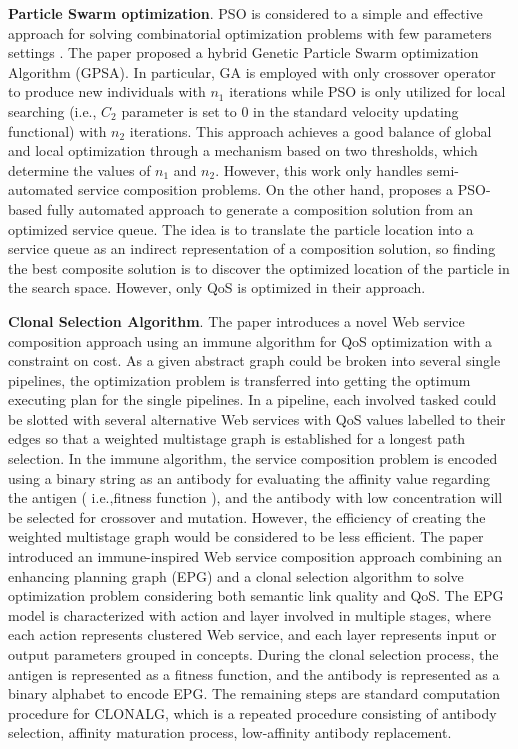 \textbf{Particle Swarm optimization}.
PSO is considered to a simple and effective approach for solving combinatorial optimization problems with few parameters settings \cite{long2009environment}. The paper \cite{liu2007hybrid} proposed a hybrid Genetic Particle Swarm optimization Algorithm (GPSA). In particular, GA is employed with only crossover operator to produce new individuals with $n_1$ iterations while PSO is only utilized for local searching (i.e., $C_2$ parameter is set to 0 in the standard velocity updating functional) with $n_2$ iterations. This approach achieves a good balance of global and local optimization through a  mechanism based on two thresholds, which determine the values of $n_1$ and $n_2$. However, this work \cite{liu2007hybrid} only handles semi-automated service composition problems. On the other hand, \cite{da2016particle} proposes a PSO-based fully automated approach to generate a composition solution from an optimized service queue. The idea is to translate the particle location into a service queue as an indirect representation of a composition solution, so finding the best composite solution is to discover the optimized location of the particle in the search space. However, only QoS is optimized in their approach.

\textbf{Clonal Selection Algorithm}.
The paper \cite{yan2006immune} introduces a novel Web service composition approach using an immune algorithm for QoS optimization with a constraint on cost. As a given abstract graph could be broken into several single pipelines, the optimization problem is transferred into getting the optimum executing plan for the single pipelines. In a pipeline, each involved tasked could be slotted with several alternative Web services with QoS values labelled to their edges so that a weighted multistage graph is established for a longest path selection. In the immune algorithm, the service composition problem is encoded using a binary string as an antibody for evaluating the affinity value regarding the antigen ( i.e.,fitness function ), and the antibody with low concentration will be selected for crossover and mutation. However, the efficiency of creating the weighted multistage graph would be considered to be less efficient. The paper \cite{pop2009immune} introduced an immune-inspired Web service composition approach combining an enhancing planning graph (EPG) and a clonal selection algorithm to solve optimization problem considering both semantic link quality and QoS.  The EPG model is characterized with action and layer involved in multiple stages, where each action represents clustered Web service, and each layer represents input or output parameters grouped in concepts. During the clonal selection process, the antigen is represented as a fitness function, and the antibody is represented as a binary alphabet to encode EPG. The remaining steps are standard computation procedure for CLONALG, which is a repeated procedure consisting of antibody selection, affinity maturation process, low-affinity antibody replacement.

